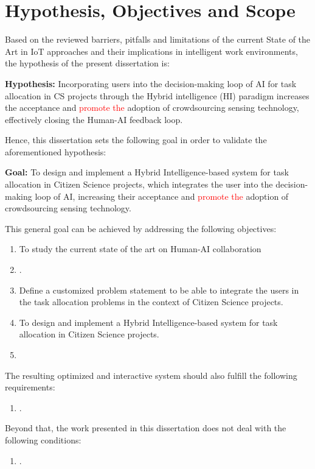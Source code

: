 
\section{Hypothesis, Objectives and Scope}
\label{cap:1-Hypothesis_Objectives_and_Scope}

Based on the reviewed barriers, pitfalls and limitations of the current State of the Art in IoT approaches and their implications in intelligent work environments, the hypothesis of the present dissertation is:


\textbf{Hypothesis:} Incorporating users into the decision-making loop of AI for task allocation in CS projects through the Hybrid intelligence (HI) paradigm increases the acceptance and \textcolor{red}{promote the} adoption of crowdsourcing sensing technology, effectively closing the Human-AI feedback loop. 


Hence, this dissertation sets the following goal in order to validate the aforementioned hypothesis:

\textbf{Goal:} To design and implement a Hybrid Intelligence-based system for task allocation in Citizen Science projects, which integrates the user into the decision-making loop of AI, increasing their acceptance and \textcolor{red}{promote the} adoption of crowdsourcing sensing technology.

This general goal can be achieved by addressing the following objectives:
\begin{enumerate}
  \item To study the current state of the art on Human-AI collaboration 
  \item .
  \item Define a customized problem statement to be able to integrate the users in the task allocation problems in the context of Citizen Science projects.
  \item To design and implement a Hybrid Intelligence-based system for task allocation in Citizen Science projects.
  \item 
\end{enumerate}

The resulting optimized and interactive system should also fulfill the following requirements:
\begin{enumerate}
  \item .
\end{enumerate}

Beyond that, the work presented in this dissertation does not deal with the following conditions:
\begin{enumerate}
  \item .
\end{enumerate}


